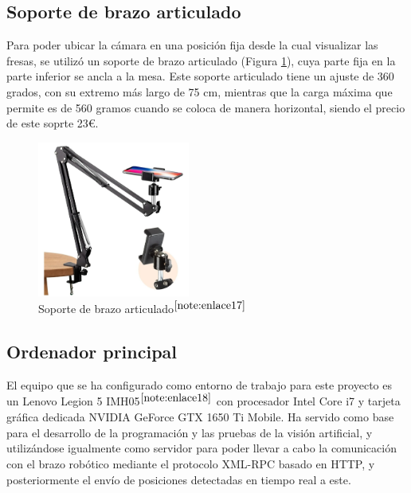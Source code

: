 \setcounter{footnote}{16}

\subsection{Soporte de brazo articulado}
\label{subsec:soporte_camara}

Para poder ubicar la cámara en una posición fija desde la cual visualizar las fresas, se utilizó un soporte de brazo articulado (Figura \ref{fig:soporte_camara}), cuya parte fija en la parte inferior se ancla a la mesa. Este soporte articulado tiene un ajuste de 360 grados, con su extremo más largo de 75 cm, mientras que la carga máxima que permite es de 560 gramos cuando se coloca de manera horizontal, siendo el precio de este soprte 23€.

\begin{figure} [H]
    \begin{center}
      \includegraphics[width=5cm]{figs/Soporte de brazo articulado.jpeg}
    \end{center}
    \caption{Soporte de brazo articulado$^{\ref{note:enlace17}}$}
    \label{fig:soporte_camara}
\end{figure}
 
\setcounter{footnote}{17} 

\subsection{Ordenador principal}
\label{subsec:ordenador}

El equipo que se ha configurado como entorno de trabajo para este proyecto es un Lenovo Legion 5 IMH05$^{\ref{note:enlace18}}$ con procesador Intel Core i7 y tarjeta gráfica dedicada NVIDIA GeForce GTX 1650 Ti Mobile. %
Ha servido como base para el desarrollo de la programación y las pruebas de la visión artificial, y utilizándose igualmente como servidor para poder llevar a cabo la comunicación con el brazo robótico mediante el protocolo XML-RPC basado en HTTP, y posteriormente el envío de posiciones detectadas en tiempo real a este. 

